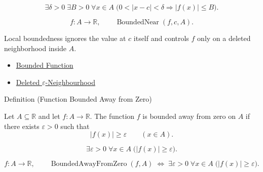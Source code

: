 \begin{remark*}
\[
  \exists\delta>0\;\exists B>0\;\forall x\in A\;
  \bigl(0<|x-c|<\delta\Rightarrow |f(x)|\leq B\bigr).
\]
\end{remark*}

\begin{remark*}
\[
  f\colon A\to\mathbb{R},\qquad\operatorname{BoundedNear}(f,c,A).
\]
\end{remark*}

\begin{remark*}[Interpretation]
Local boundedness ignores the value at \(c\) itself and controls \(f\) only on
a deleted neighborhood inside \(A\).
\end{remark*}

\begin{dependencies}
\begin{itemize}
  \item \hyperref[def:function-bounded]{Bounded Function}
  \item \hyperref[def:deleted-epsilon-neighbourhood]{Deleted \(\varepsilon\)-Neighbourhood}
\end{itemize}
\end{dependencies}

\begin{definitionbox}{Definition (Function Bounded Away from Zero)}
\begin{definition}
\label{def:function-bounded-away-from-zero}
Let \(A\subseteq\mathbb{R}\) and let \(f:A\to\mathbb{R}\).  The function
\(f\) is bounded away from zero on \(A\) if there exists \(\varepsilon>0\)
such that
\[
  |f(x)|\geq\varepsilon
  \qquad (x\in A).
\]
\end{definition}
\end{definitionbox}

\begin{remark*}
\[
  \exists\varepsilon>0\;\forall x\in A\;\bigl(|f(x)|\geq\varepsilon\bigr).
\]
\end{remark*}

\begin{remark*}
\[
  f\colon A\to\mathbb{R},\qquad\operatorname{BoundedAwayFromZero}(f,A)
  \;\Longleftrightarrow\;
  \exists\varepsilon>0\;\forall x\in A\;\bigl(|f(x)|\geq\varepsilon\bigr).
\]
\end{remark*}

